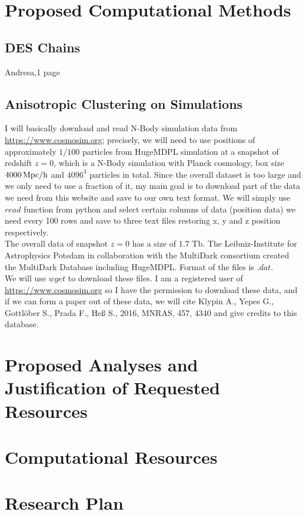 \documentclass[12pt]{article}
\begin{document}
\begin{small}
\section{Proposed Computational Methods}
\subsection{DES Chains}
Andresa,1 page
\subsection{Anisotropic Clustering on Simulations}
I will basically download and read N-Body simulation data from \url{https://www.cosmosim.org}; precisely, we will need to use positions of approximately $1/100$ particles from HugeMDPL simulation at a snapshot of redshift $z=0$, which is a N-Body simulation with Planck cosmology, box size $4000 \, \rm  Mpc/h$ and $4096^3$ particles in total. Since the overall dataset is too large and we only need to use a fraction of it, my main goal is to download part of the data we need from this website and save to our own text format. We will simply use $read$ function from python and select certain columns of data (position data) we need every 100 rows and save to three text files restoring x, y and z position respectively.\\
The overall data of snapshot $z=0$ has a size of $1.7$ Tb. The Leibniz-Institute for Astrophysics Potsdam in collaboration with the MultiDark consortium created the MultiDark Database including HugeMDPL. Format of the files is $.dat$. \\
We will use $wget$ to download these files. I am a registered user of \url{https://www.cosmosim.org} so I have the permission to download these data, and if we can form a paper out of these data, we will cite Klypin A., Yepes G., Gottl{\"o}ber S., Prada F., He{\ss} S., 2016, MNRAS, 457, 4340 and give credits to this database.


\section{Proposed Analyses and Justification of Requested Resources}

\section{Computational Resources}

\section{Research Plan}


\end{small}
\end{document}
